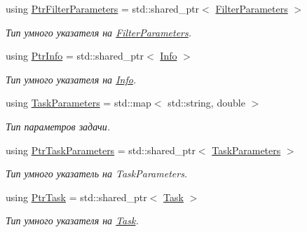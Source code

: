 \begin{DoxyCompactItemize}
\item 
using \hyperlink{namespace_core_a4811af8148ba137d644b9a61a042cf03}{Ptr\+Filter\+Parameters} = std\+::shared\+\_\+ptr$<$ \hyperlink{class_core_1_1_filter_parameters}{Filter\+Parameters} $>$\hypertarget{namespace_core_a4811af8148ba137d644b9a61a042cf03}{}\label{namespace_core_a4811af8148ba137d644b9a61a042cf03}

\begin{DoxyCompactList}\small\item\em Тип умного указателя на \hyperlink{class_core_1_1_filter_parameters}{Filter\+Parameters}. \end{DoxyCompactList}\item 
using \hyperlink{namespace_core_a647483da8a1266d5bbd3e9bb5cd66d08}{Ptr\+Info} = std\+::shared\+\_\+ptr$<$ \hyperlink{class_core_1_1_info}{Info} $>$\hypertarget{namespace_core_a647483da8a1266d5bbd3e9bb5cd66d08}{}\label{namespace_core_a647483da8a1266d5bbd3e9bb5cd66d08}

\begin{DoxyCompactList}\small\item\em Тип умного указателя на \hyperlink{class_core_1_1_info}{Info}. \end{DoxyCompactList}\item 
using \hyperlink{namespace_core_a34db09964ddb6b4af04cc94b02a49e29}{Task\+Parameters} = std\+::map$<$ std\+::string, double $>$\hypertarget{namespace_core_a34db09964ddb6b4af04cc94b02a49e29}{}\label{namespace_core_a34db09964ddb6b4af04cc94b02a49e29}

\begin{DoxyCompactList}\small\item\em Тип параметров задачи. \end{DoxyCompactList}\item 
using \hyperlink{namespace_core_a3e0e555656bf795146ebb0882e28da2f}{Ptr\+Task\+Parameters} = std\+::shared\+\_\+ptr$<$ \hyperlink{namespace_core_a34db09964ddb6b4af04cc94b02a49e29}{Task\+Parameters} $>$\hypertarget{namespace_core_a3e0e555656bf795146ebb0882e28da2f}{}\label{namespace_core_a3e0e555656bf795146ebb0882e28da2f}

\begin{DoxyCompactList}\small\item\em Тип умного указатель на Task\+Parameters. \end{DoxyCompactList}\item 
using \hyperlink{namespace_core_abfda8f69fcacfcea2696549b548ed737}{Ptr\+Task} = std\+::shared\+\_\+ptr$<$ \hyperlink{class_core_1_1_task}{Task} $>$\hypertarget{namespace_core_abfda8f69fcacfcea2696549b548ed737}{}\label{namespace_core_abfda8f69fcacfcea2696549b548ed737}

\begin{DoxyCompactList}\small\item\em Тип умного указателя на \hyperlink{class_core_1_1_task}{Task}. \end{DoxyCompactList}\end{DoxyCompactItemize}
